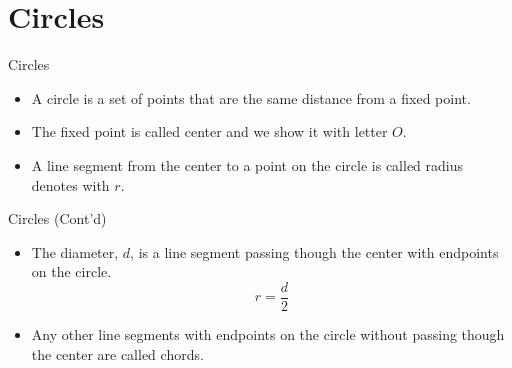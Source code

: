 \section{Circles}
\begin{frame}{Circles}
    \begin{itemize}
        \item A circle is a set of points that are the same distance from a fixed point.
        \item The fixed point is called center and we show it with letter $O$.
        \item A line segment from the center to a point on the circle is called radius denotes with $r$.
    \end{itemize}
    \begin{figure}[H]
        \centering
        
    \end{figure}
\end{frame}
\begin{frame}{Circles (Cont'd)}
    \begin{itemize}
        \item The diameter, $d$, is a line segment passing though the center with endpoints on the circle.
        \[          r = \frac{d}{2}   \]
        \item Any other line segments with endpoints on the circle without passing though the center are called chords.
    \end{itemize}
    \begin{figure}[H]
        \centering
        
    \end{figure}
\end{frame}

